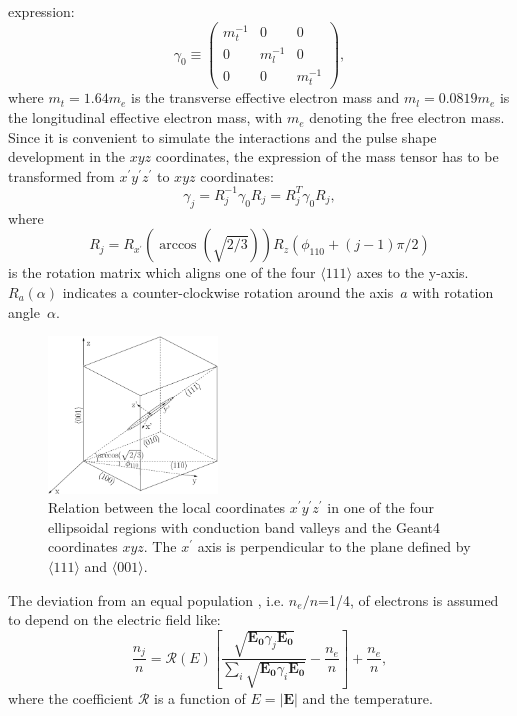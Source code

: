 expression:
\begin{equation} 
\label{eq:pss:g0} 
\gamma_{0} \equiv \left( 
\begin{array}{ccc} 
m_{t}^{-1} & 0 & 0 \\ 
0 & m_{l}^{-1} & 0 \\ 
0 & 0 & m_{t}^{-1} 
\end{array} \right), 
\end{equation} 
where $m_{t} = 1.64m_{e}$ is the transverse effective electron mass
and $m_{l} = 0.0819m_{e}$ is the longitudinal effective electron mass,
with $m_{e}$ denoting the free electron mass. Since it is convenient
to simulate the interactions and the pulse shape development in the
$xyz$ coordinates, the expression of the mass tensor has to be
transformed from $x^{\prime}y^{\prime}z^{\prime}$ to $xyz$
coordinates:
\begin{equation} 
\label{eq:pss:gs} 
\gamma_{j} = R_{j}^{-1}\gamma_{0}R_{j} = R_{j}^{T}\gamma_{0}R_{j}, 
\end{equation} 
where 
\begin{equation} 
\label{eq:pss:rs} 
R_{j} = R_{x^{\prime}}(\arccos(\sqrt{2/3}))R_{z}(\phi_{110}+(j-1)\pi/2) 
\end{equation} 
is the rotation matrix which aligns one of the four $\langle 111
\rangle$ axes to the y-axis. $R_a(\alpha)$ indicates a
counter-clockwise rotation around the axis~$a$ with rotation
angle~$\alpha$.
 
\begin{figure} 
\centering 
\includegraphics[width=0.4\textwidth]{axes}   
\caption{Relation between the local coordinates
$x^{\prime}y^{\prime}z^{\prime}$ in one of the four ellipsoidal
regions with conduction band valleys and the Geant4 coordinates
$xyz$. The $x^{\prime}$ axis is perpendicular to the plane defined by
$\langle111\rangle$ and $\langle001\rangle$.}
\label{fig:pss:axes} 
\end{figure} 
 
The deviation from an equal population , i.e. $n_{e}/n$=1/4, of
electrons is assumed to depend on the electric field like:
\begin{equation} 
\label{eq:pss:nion} 
\frac{n_{j}}{n} = \mathcal{R}(E) \left[ \frac{\sqrt{\mathbf{E_{0}}\gamma_{j}\mathbf{E_{0}}}} 
{\sum_{i}\sqrt{\mathbf{E_{0}}\gamma_{i}\mathbf{E_{0}}}} - \frac{n_{e}}{n} \right] + \frac{n_{e}}{n},  
\end{equation} 
where the coefficient $\mathcal{R}$ is a function of $E=|\mathbf{E}|$
and the temperature.
 
